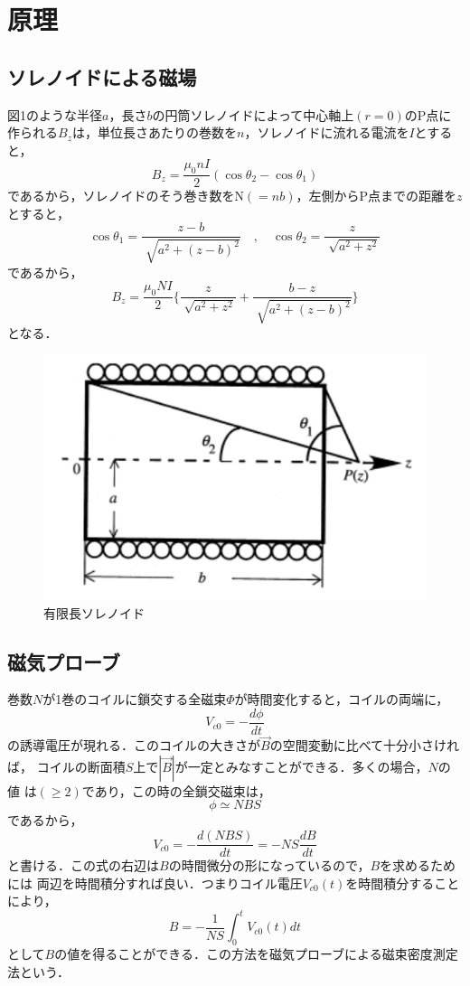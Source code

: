 
\section{原理}

\subsection{ソレノイドによる磁場}
図1のような半径$a$，長さ$b$の円筒ソレノイドによって中心軸上$(r = 0)$のP点に
作られる$B_z$は，単位長さあたりの巻数を$n$，ソレノイドに流れる電流を$I$とすると，
$$
B_z=\frac{\mu_0 n I}{2}(\cos \theta_2 - \cos \theta_1)
$$
であるから，ソレノイドのそう巻き数をN$(=nb)$，左側からP点までの距離を$z$とすると，
$$
\cos \theta_1 = \frac{z-b}{\sqrt[]{a^2+(z-b)^2}}\quad,\quad \cos \theta_2 = \frac{z}{\sqrt[]{a^2+z^2}}
$$
であるから，
$$
B_z=\frac{\mu_0 NI}{2} \{ \frac{z}{\sqrt[]{a^2+z^2}} + \frac{b-z}{\sqrt[]{a^2+(z-b)^2}} \}
$$
となる．
\begin{figure}[!ht]
    \centering
    \includegraphics[scale=0.75]{figure1.pdf}
    \caption{有限長ソレノイド}
\end{figure}

\subsection{磁気プローブ}
巻数$N$が1巻のコイルに鎖交する全磁束$\Phi$が時間変化すると，コイルの両端に，
$$
V_{c0}=-\frac{d\phi}{dt}
$$
の誘導電圧が現れる．このコイルの大きさが$\vec{B}$の空間変動に比べて十分小さければ，
コイルの断面積$S$上で$|\vec{B}|$が一定とみなすことができる．多くの場合，$N$の値
は$(\geq2)$であり，この時の全鎖交磁束は，
$$
\phi \simeq NBS
$$
であるから，
$$
V_{c0}=- \frac{d(NBS)}{dt}=-NS\frac{dB}{dt}
$$
と書ける．この式の右辺は$B$の時間微分の形になっているので，$B$を求めるためには
両辺を時間積分すれば良い．つまりコイル電圧$V_{c0}(t)$を時間積分することにより，
$$
B=-\frac{1}{NS} \int_{0}^{t} V_{c0}(t)dt
$$
として$B$の値を得ることができる．この方法を磁気プローブによる磁束密度測定法という．

